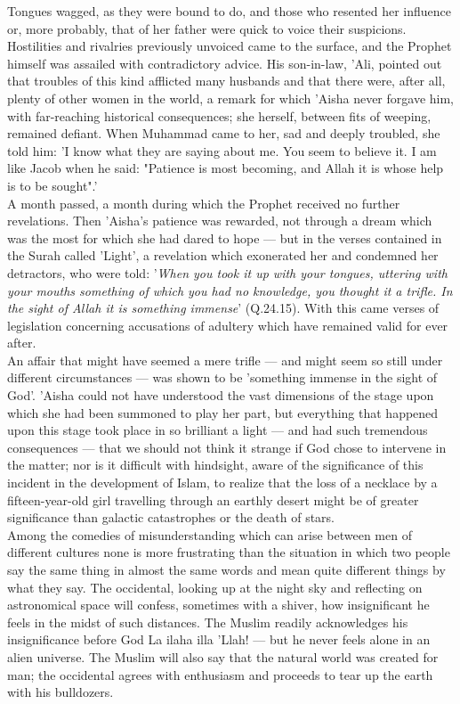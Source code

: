 \documentclass[11pt, b5paper, twoside]{book}
\begin{document}
Tongues wagged, as they were bound to do, and those who resented her influence or, more probably, 
that of her father were quick to voice their suspicions. Hostilities and rivalries previously 
unvoiced came to the surface, and the Prophet himself was assailed with contradictory advice. His 
son-in-law, 'Ali, pointed out that troubles of this kind afflicted many husbands and that there were, 
after all, plenty of other women in the world, a remark for which 'Aisha never forgave him, with 
far-reaching historical consequences; she herself, between fits of weeping, remained defiant. When 
Muhammad came to her, sad and deeply troubled, she told him: 'I know what they are saying about me. 
You seem to believe it. I am like Jacob when he said: "Patience is most becoming, and Allah it is 
whose help is to be sought".' \\

A month passed, a month during which the Prophet received no further revelations. Then 'Aisha's 
patience was rewarded, not through a dream which was the most for which she had dared to hope --- but 
in the verses contained in the Surah called 'Light', a revelation which exonerated her and condemned 
her detractors, who were told: '\emph{When you took it up with your tongues, uttering with your mouths 
something of which you had no knowledge, you thought it a trifle. In the sight of Allah it is 
something immense}' (Q.24.15). With this came verses of legislation concerning accusations of adultery 
which have remained valid for ever after. \\

An affair that might have seemed a mere trifle --- and might seem so still under different 
circumstances --- was shown to be 'something immense in the sight of God'. 'Aisha could not have 
understood the vast dimensions of the stage upon which she had been summoned to play her part, but 
everything that happened upon this stage took place in so brilliant a light --- and had such tremendous 
consequences --- that we should not think it strange if God chose to intervene in the matter; nor is it 
difficult with hindsight, aware of the significance of this incident in the development of Islam, to 
realize that the loss of a necklace by a fifteen-year-old girl travelling through an earthly desert 
might be of greater significance than galactic catastrophes or the death of stars. \\

Among the comedies of misunderstanding which can arise between men of different cultures none is more 
frustrating than the situation in which two people say the same thing in almost the same words and 
mean quite different things by what they say. The occidental, looking up at the night sky and 
reflecting on astronomical space will confess, sometimes with a shiver, how insignificant he feels in 
the midst of such distances. The Muslim readily acknowledges his insignificance before God La ilaha 
illa 'Llah! --- but he never feels alone in an alien universe. The Muslim will also say that the 
natural world was created for man; the occidental agrees with enthusiasm and proceeds to tear up the 
earth with his bulldozers. \\
\end{document}

